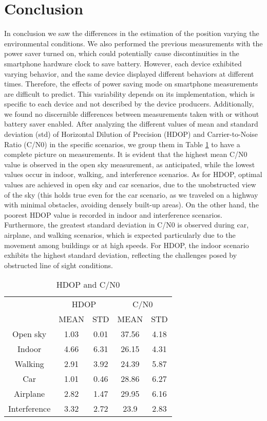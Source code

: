 \section{Conclusion}
\label{sec:conclusion}

In conclusion we saw the differences in the estimation of the position varying the environmental conditions. We also performed the previous measurements with the power saver turned on, which could potentially cause discontinuities in the smartphone hardware clock to save battery. However, each device exhibited varying behavior, and the same device displayed different behaviors at different times. Therefore, the effects of power saving mode on smartphone measurements are difficult to predict. This variability depends on its implementation, which is specific to each device and not described by the device producers. Additionally, we found no discernible differences between measurements taken with or without battery saver enabled. After analyzing the different values of mean and standard deviation (std) of Horizontal Dilution of Precision (HDOP) and Carrier-to-Noise Ratio (C/N0) in the specific scenarios, we group them in Table \ref{tab:hdop_cn0} to have a complete picture on measurements. It is evident that the highest mean C/N0 value is observed in the open sky measurement, as anticipated, while the lowest values occur in indoor, walking, and interference scenarios. As for HDOP, optimal values are achieved in open sky and car scenarios, due to the unobstructed view of the sky (this holds true even for the car scenario, as we traveled on a highway with minimal obstacles, avoiding densely built-up areas). On the other hand, the poorest HDOP value is recorded in indoor and interference scenarios. Furthermore, the greatest standard deviation in C/N0 is observed during car, airplane, and walking scenarios, which is expected particularly due to the movement among buildings or at high speeds. For HDOP, the indoor scenario exhibits the highest standard deviation, reflecting the challenges posed by obstructed line of sight conditions.

\vspace{0.5cm}
\begin{table}[htbp]
    \centering
    \begin{tabular}{|c|cc|cc|}
        \hline
        & \multicolumn{2}{c|}{HDOP} & \multicolumn{2}{c|}{C/N0} \\
        \cline{2-5}
        & MEAN & STD & MEAN & STD \\
        \hline        
        Open sky & 1.03 & 0.01 & 37.56 & 4.18 \\
        Indoor & 4.66 & 6.31 & 26.15 & 4.31 \\
        Walking & 2.91 & 3.92 & 24.39 & 5.87 \\
        Car & 1.01 & 0.46 & 28.86 & 6.27 \\
        Airplane & 2.82  & 1.47 & 29.95 & 6.16 \\
        Interference & 3.32 & 2.72 & 23.9 & 2.83 \\
        \hline
    \end{tabular}
    \vspace{0.5cm}
    \caption{HDOP and C/N0 \label{tab:hdop_cn0}}
\end{table}


